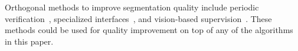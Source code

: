 \documentclass[letterpaper]{article}
\begin{document}
\par Orthogonal methods to improve segmentation quality include periodic verification~\cite{Lin2014,Everingham15}, specialized interfaces~\cite{Song2018}, and vision-based supervision~\cite{Russakovsky2015,Gurari2016}. These methods could be used for quality improvement on top of any of the algorithms in this paper.  %




\end{document}
